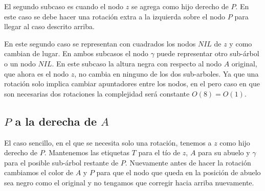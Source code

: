 \documentclass[10pt,a4paper]{article}
\begin{document}
El segundo subcaso es cuando el nodo $z$ se agrega como hijo derecho de $P$. En este caso se debe hacer una rotaci\'on extra a la izquierda sobre el nodo $P$ para llegar al caso descrito arriba.

\hspace{1cm}
\hspace{1cm}
\vspace{1cm}

En este segundo caso se representan con cuadrados los nodos $NIL$ de $z$ y como cambian de lugar. En ambos subcasos el nodo $\gamma$ puede representar otro sub-\'arbol o un nodo $NIL$. En este subcaso la altura negra con respecto al nodo $A$ original, que ahora es el nodo $z$, no cambia en ninguno de los dos sub-arboles. Ya que una rotaci\'on solo implica cambiar apuntadores entre los nodos, en el pero caso en que son necesarias dos rotaciones la complejidad ser\'a constante $O(8)=O(1)$.

\subsection*{$P$ a la derecha de $A$}
El caso sencillo, en el que se necesita solo una rotaci\'on, tenemos a $z$ como hijo derecho de $P$. Mantenemos las etiquetas $T$ para el t\'io de $z$, $A$ para su abuelo y $\gamma$ para el posible sub-\'arbol restante de $P$. Nuevamente antes de hacer la rotaci\'on cambiamos el color de $A$ y $P$ para que el nodo que queda en la posici\'on de abuelo sea negro como el original y no tengamos que corregir hacia arriba nuevamente.
\end{document}
